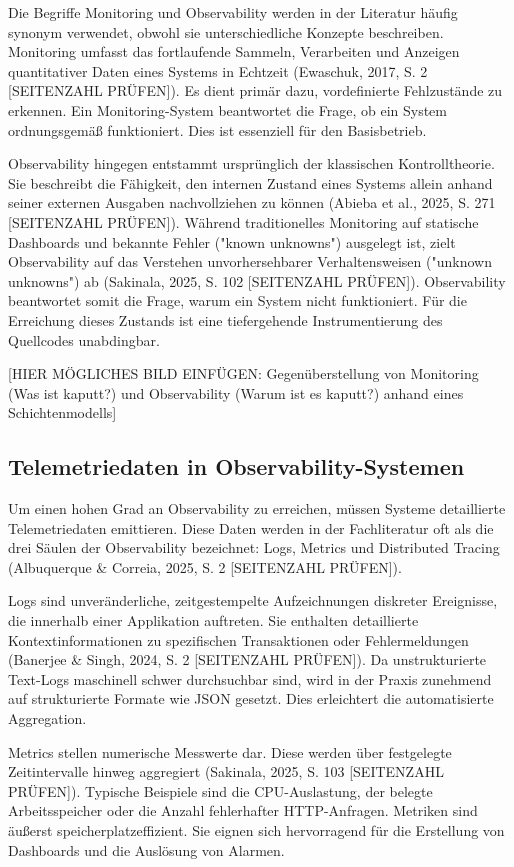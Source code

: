 Die Begriffe Monitoring und Observability werden in der Literatur häufig synonym verwendet, obwohl sie unterschiedliche Konzepte beschreiben. Monitoring umfasst das fortlaufende Sammeln, Verarbeiten und Anzeigen quantitativer Daten eines Systems in Echtzeit (Ewaschuk, 2017, S. 2 [SEITENZAHL PRÜFEN]). Es dient primär dazu, vordefinierte Fehlzustände zu erkennen. Ein Monitoring-System beantwortet die Frage, ob ein System ordnungsgemäß funktioniert. Dies ist essenziell für den Basisbetrieb.

Observability hingegen entstammt ursprünglich der klassischen Kontrolltheorie. Sie beschreibt die Fähigkeit, den internen Zustand eines Systems allein anhand seiner externen Ausgaben nachvollziehen zu können (Abieba et al., 2025, S. 271 [SEITENZAHL PRÜFEN]). Während traditionelles Monitoring auf statische Dashboards und bekannte Fehler ("known unknowns") ausgelegt ist, zielt Observability auf das Verstehen unvorhersehbarer Verhaltensweisen ("unknown unknowns") ab (Sakinala, 2025, S. 102 [SEITENZAHL PRÜFEN]). Observability beantwortet somit die Frage, warum ein System nicht funktioniert. Für die Erreichung dieses Zustands ist eine tiefergehende Instrumentierung des Quellcodes unabdingbar.

[HIER MÖGLICHES BILD EINFÜGEN: Gegenüberstellung von Monitoring (Was ist kaputt?) und Observability (Warum ist es kaputt?) anhand eines Schichtenmodells]

\subsection{Telemetriedaten in Observability-Systemen}

Um einen hohen Grad an Observability zu erreichen, müssen Systeme detaillierte Telemetriedaten emittieren. Diese Daten werden in der Fachliteratur oft als die drei Säulen der Observability bezeichnet: Logs, Metrics und Distributed Tracing (Albuquerque \& Correia, 2025, S. 2 [SEITENZAHL PRÜFEN]).

Logs sind unveränderliche, zeitgestempelte Aufzeichnungen diskreter Ereignisse, die innerhalb einer Applikation auftreten. Sie enthalten detaillierte Kontextinformationen zu spezifischen Transaktionen oder Fehlermeldungen (Banerjee \& Singh, 2024, S. 2 [SEITENZAHL PRÜFEN]). Da unstrukturierte Text-Logs maschinell schwer durchsuchbar sind, wird in der Praxis zunehmend auf strukturierte Formate wie JSON gesetzt. Dies erleichtert die automatisierte Aggregation.

Metrics stellen numerische Messwerte dar. Diese werden über festgelegte Zeitintervalle hinweg aggregiert (Sakinala, 2025, S. 103 [SEITENZAHL PRÜFEN]). Typische Beispiele sind die CPU-Auslastung, der belegte Arbeitsspeicher oder die Anzahl fehlerhafter HTTP-Anfragen. Metriken sind äußerst speicherplatzeffizient. Sie eignen sich hervorragend für die Erstellung von Dashboards und die Auslösung von Alarmen.

